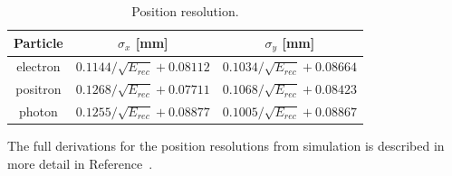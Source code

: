 \begin{table}[H]
\caption{Position resolution.}
\label{tab:PosnResTable}
\centering
\begin{tabular}{|c|c|c|}
\toprule
Particle & $\sigma_x$ [mm] & $\sigma_y$ [mm] \\
\midrule
electron & $0.1144/\sqrt{E_{rec}}+0.08112$ & $0.1034/\sqrt{E_{rec}}+0.08664$ \\
positron & $0.1268/\sqrt{E_{rec}}+0.07711$ & $0.1068/\sqrt{E_{rec}}+0.08423$ \\
photon & $0.1255/\sqrt{E_{rec}}+0.08877$ & $0.1005/\sqrt{E_{rec}}+0.08867$ \\
\bottomrule
\end{tabular}
\end{table}

The full derivations for the position resolutions from simulation is described in more detail in Reference~\cite{Garcon}.
